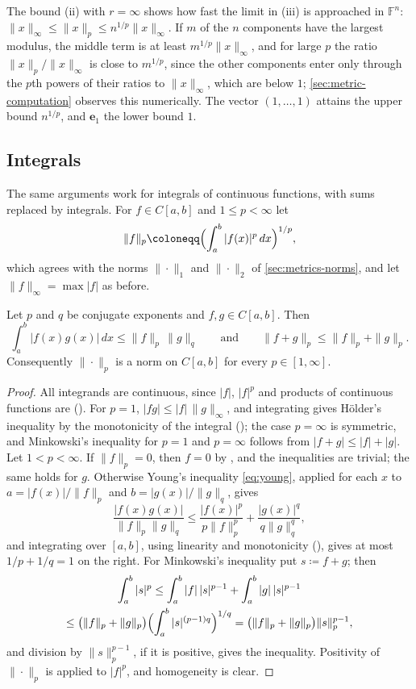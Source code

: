 The bound (ii) with $r=\infty$ shows how fast the limit in (iii) is approached in $\mathbb F^n$: $\|x\|_\infty\le\|x\|_p\le n^{1/p}\|x\|_\infty$. If $m$ of the $n$ components have the largest modulus, the middle term is at least $m^{1/p}\|x\|_\infty$, and for large $p$ the ratio $\|x\|_p/\|x\|_\infty$ is close to $m^{1/p}$, since the other components enter only through the $p$th powers of their ratios to $\|x\|_\infty$, which are below $1$; \cref{sec:metric-computation} observes this numerically. The vector $(1,\ldots,1)$ attains the upper bound $n^{1/p}$, and $\mathbf e_1$ the lower bound $1$.

\subsection{Integrals}

The same arguments work for integrals of continuous functions, with sums replaced by integrals. For $f\in C[a,b]$ and $1\le p<\infty$ let
\[
\|f\|_p\coloneqq\Bigl(\int_a^b|f(x)|^p\,dx\Bigr)^{1/p},
\]
which agrees with the norms $\|\cdot\|_1$ and $\|\cdot\|_2$ of \cref{sec:metrics-norms}, and let $\|f\|_\infty=\max|f|$ as before.

\begin{theorem}
\label{thm:holder-integral}
Let $p$ and $q$ be conjugate exponents and $f,g\in C[a,b]$. Then
\[
\int_a^b|f(x)g(x)|\,dx\le\|f\|_p\,\|g\|_q\qquad\text{and}\qquad\|f+g\|_p\le\|f\|_p+\|g\|_p .
\]
Consequently $\|\cdot\|_p$ is a norm on $C[a,b]$ for every $p\in[1,\infty]$.
\end{theorem}

\begin{proof}
All integrands are continuous, since $|f|$, $|f|^p$ and products of continuous functions are (). For $p=1$, $|fg|\le|f|\,\|g\|_\infty$, and integrating gives H\"older's inequality by the monotonicity of the integral (); the case $p=\infty$ is symmetric, and Minkowski's inequality for $p=1$ and $p=\infty$ follows from $|f+g|\le|f|+|g|$. Let $1<p<\infty$. If $\|f\|_p=0$, then $f=0$ by , and the inequalities are trivial; the same holds for $g$. Otherwise Young's inequality \eqref{eq:young}, applied for each $x$ to $a=|f(x)|/\|f\|_p$ and $b=|g(x)|/\|g\|_q$, gives
\[
\frac{|f(x)g(x)|}{\|f\|_p\|g\|_q}\le\frac{|f(x)|^p}{p\|f\|_p^p}+\frac{|g(x)|^q}{q\|g\|_q^q},
\]
and integrating over $[a,b]$, using linearity and monotonicity (), gives at most $1/p+1/q=1$ on the right. For Minkowski's inequality put $s\coloneqq f+g$; then
\begin{multline*}
\int_a^b|s|^p\le\int_a^b|f|\,|s|^{p-1}+\int_a^b|g|\,|s|^{p-1}\\\le\bigl(\|f\|_p+\|g\|_p\bigr)\Bigl(\int_a^b|s|^{(p-1)q}\Bigr)^{1/q}=\bigl(\|f\|_p+\|g\|_p\bigr)\|s\|_p^{p-1},
\end{multline*}
and division by $\|s\|_p^{p-1}$, if it is positive, gives the inequality. Positivity of $\|\cdot\|_p$ is  applied to $|f|^p$, and homogeneity is clear.
\end{proof}

